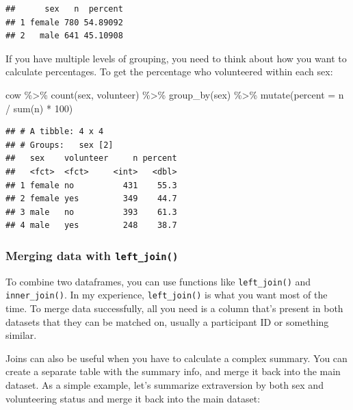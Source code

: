 \documentclass[
]{book}
\newenvironment{Shaded}{\begin{snugshade}}{\end{snugshade}}
\newcommand{\AttributeTok}[1]{\textcolor[rgb]{0.77,0.63,0.00}{#1}}
\newcommand{\DecValTok}[1]{\textcolor[rgb]{0.00,0.00,0.81}{#1}}
\newcommand{\FunctionTok}[1]{\textcolor[rgb]{0.00,0.00,0.00}{#1}}
\newcommand{\NormalTok}[1]{#1}
\newcommand{\SpecialCharTok}[1]{\textcolor[rgb]{0.00,0.00,0.00}{#1}}
\begin{document}
\begin{verbatim}
##      sex   n  percent
## 1 female 780 54.89092
## 2   male 641 45.10908
\end{verbatim}

If you have multiple levels of grouping, you need to think about
how you want to calculate percentages. To get the percentage
who volunteered within each sex:

\begin{Shaded}
\begin{Highlighting}[]
\NormalTok{cow }\SpecialCharTok{\%\textgreater{}\%}
    \FunctionTok{count}\NormalTok{(sex, volunteer) }\SpecialCharTok{\%\textgreater{}\%}
    \FunctionTok{group\_by}\NormalTok{(sex) }\SpecialCharTok{\%\textgreater{}\%}
    \FunctionTok{mutate}\NormalTok{(}\AttributeTok{percent =}\NormalTok{ n }\SpecialCharTok{/} \FunctionTok{sum}\NormalTok{(n) }\SpecialCharTok{*} \DecValTok{100}\NormalTok{)}
\end{Highlighting}
\end{Shaded}

\begin{verbatim}
## # A tibble: 4 x 4
## # Groups:   sex [2]
##   sex    volunteer     n percent
##   <fct>  <fct>     <int>   <dbl>
## 1 female no          431    55.3
## 2 female yes         349    44.7
## 3 male   no          393    61.3
## 4 male   yes         248    38.7
\end{verbatim}

\hypertarget{merging-data-with-left_join}{%
\subsubsection{\texorpdfstring{Merging data with \texttt{left\_join()}}{Merging data with left\_join()}}\label{merging-data-with-left_join}}

To combine two dataframes, you can use functions like \texttt{left\_join()}
and \texttt{inner\_join()}. In my experience, \texttt{left\_join()} is what you
want most of the time. To merge data successfully, all you
need is a column that's present in both datasets that they can
be matched on, usually a participant ID or something similar.

Joins can also be useful when you have to calculate a complex
summary. You can create a separate table with the summary info,
and merge it back into the main dataset. As a simple example,
let's summarize extraversion by both sex and volunteering
status and merge it back into the main dataset:
\end{document}
